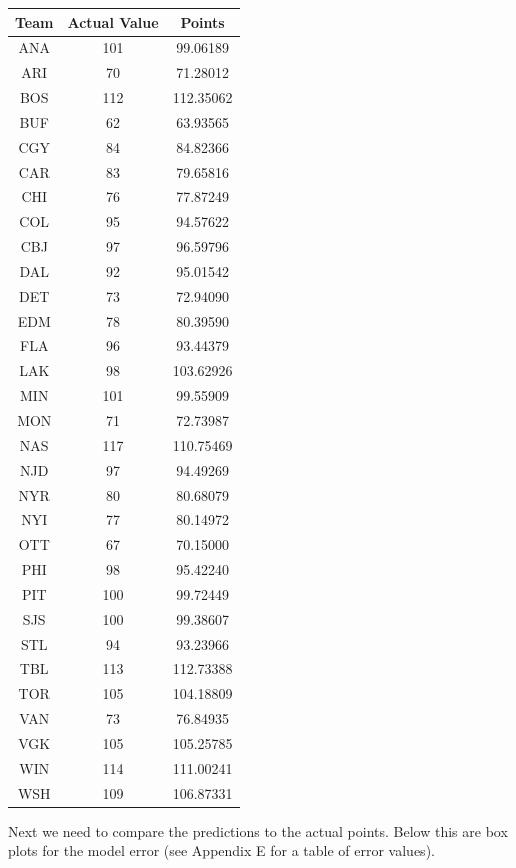 \begin{longtable}{|c|c|c|}
	\hline
	Team & Actual Value & Points \\
	\hline
ANA & 101 & 99.06189 \\
ARI & 70 & 71.28012 \\
BOS & 112 & 112.35062 \\
BUF & 62 &  63.93565 \\
CGY & 84 &  84.82366 \\
CAR & 83 &  79.65816 \\
CHI & 76 &  77.87249 \\
COL & 95 &  94.57622 \\
CBJ & 97 & 96.59796 \\
DAL & 92 & 95.01542 \\
DET & 73 & 72.94090 \\
EDM & 78 & 80.39590 \\
FLA & 96 & 93.44379 \\
LAK & 98 & 103.62926 \\
MIN & 101& 99.55909 \\
MON & 71 & 72.73987 \\
NAS & 117 & 110.75469 \\
NJD & 97 & 94.49269 \\
NYR & 80 & 80.68079 \\
NYI & 77 & 80.14972 \\
OTT & 67& 70.15000 \\
\hline
PHI & 98 & 95.42240 \\
PIT & 100 & 99.72449 \\
SJS & 100 & 99.38607 \\
STL & 94 & 93.23966 \\
TBL & 113 & 112.73388 \\
TOR & 105 & 104.18809 \\
VAN & 73 & 76.84935 \\
VGK & 105 & 105.25785 \\
WIN & 114 &111.00241 \\
WSH & 109 &106.87331 \\
	\hline
\end{longtable}
\label{tbl:Ridge Regression Prediction}
Next we need to compare the predictions to the actual points. Below this are box plots for the model error (see Appendix E for a table of error values).
